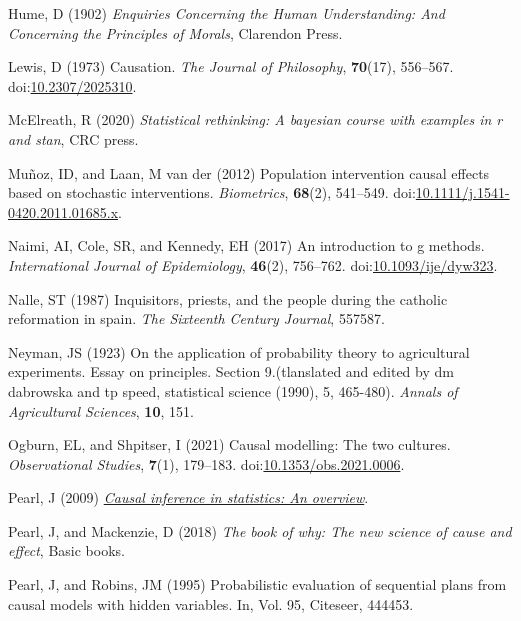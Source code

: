 \documentclass[
  singlecolumn,
  9pt]{article}
\begin{document}
\begin{CSLReferences}
Hume, D (1902) \emph{Enquiries Concerning the Human Understanding: And
Concerning the Principles of Morals}, Clarendon Press.

Lewis, D (1973) Causation. \emph{The Journal of Philosophy},
\textbf{70}(17), 556--567.
doi:\href{https://doi.org/10.2307/2025310}{10.2307/2025310}.

McElreath, R (2020) \emph{Statistical rethinking: A bayesian course with
examples in r and stan}, CRC press.

Muñoz, ID, and Laan, M van der (2012) Population intervention causal
effects based on stochastic interventions. \emph{Biometrics},
\textbf{68}(2), 541--549.
doi:\href{https://doi.org/10.1111/j.1541-0420.2011.01685.x}{10.1111/j.1541-0420.2011.01685.x}.

Naimi, AI, Cole, SR, and Kennedy, EH (2017) An introduction to g
methods. \emph{International Journal of Epidemiology}, \textbf{46}(2),
756--762.
doi:\href{https://doi.org/10.1093/ije/dyw323}{10.1093/ije/dyw323}.

Nalle, ST (1987) Inquisitors, priests, and the people during the
catholic reformation in spain. \emph{The Sixteenth Century Journal},
557587.

Neyman, JS (1923) On the application of probability theory to
agricultural experiments. Essay on principles. Section 9.(tlanslated and
edited by dm dabrowska and tp speed, statistical science (1990), 5,
465-480). \emph{Annals of Agricultural Sciences}, \textbf{10}, 151.

Ogburn, EL, and Shpitser, I (2021) Causal modelling: The two cultures.
\emph{Observational Studies}, \textbf{7}(1), 179--183.
doi:\href{https://doi.org/10.1353/obs.2021.0006}{10.1353/obs.2021.0006}.

Pearl, J (2009) \emph{\href{https://doi.org/10.1214/09-SS057}{Causal
inference in statistics: An overview}}.

Pearl, J, and Mackenzie, D (2018) \emph{The book of why: The new science
of cause and effect}, Basic books.

Pearl, J, and Robins, JM (1995) Probabilistic evaluation of sequential
plans from causal models with hidden variables. In, Vol. 95, Citeseer,
444453.


\end{CSLReferences}
\end{document}
